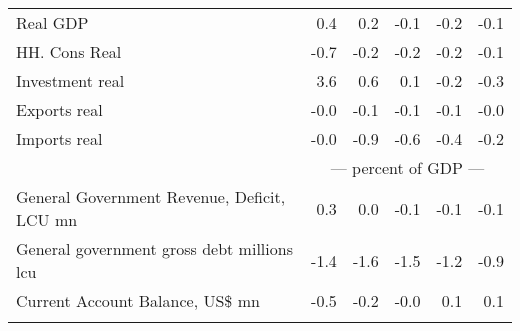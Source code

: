 \documentclass{article}
\begin{document}
\begin{table}[ht]
\begin{tabular}{lrrrrr}
Real GDP & 0.4 & 0.2 & -0.1 & -0.2 & -0.1 \\
HH. Cons Real & -0.7 & -0.2 & -0.2 & -0.2 & -0.1 \\
Investment real & 3.6 & 0.6 & 0.1 & -0.2 & -0.3 \\
Exports real & -0.0 & -0.1 & -0.1 & -0.1 & -0.0 \\
Imports real & -0.0 & -0.9 & -0.6 & -0.4 & -0.2 \\
&\multicolumn{5}{c}{--- percent of GDP ---}           \\
General Government Revenue, Deficit, LCU mn & 0.3 & 0.0 & -0.1 & -0.1 & -0.1 \\
General government gross debt millions lcu & -1.4 & -1.6 & -1.5 & -1.2 & -0.9 \\
Current Account Balance, US\$ mn & -0.5 & -0.2 & -0.0 & 0.1 & 0.1 \\
&\multicolumn{5}{c}{ }           \\
\bottomrule
\end{tabular}
\end{table}
\end{document}
